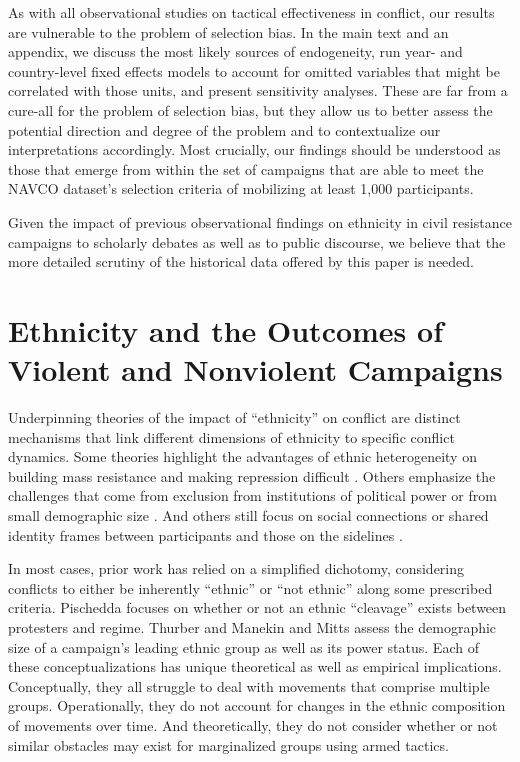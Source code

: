 \documentclass[
  letterpaper,
  DIV=11,
  numbers=noendperiod]{scrartcl}
\begin{document}
As with all observational studies on tactical effectiveness in conflict,
our results are vulnerable to the problem of selection bias. In the main
text and an appendix, we discuss the most likely sources of endogeneity,
run year- and country-level fixed effects models to account for omitted
variables that might be correlated with those units, and present
sensitivity analyses. These are far from a cure-all for the problem of
selection bias, but they allow us to better assess the potential
direction and degree of the problem and to contextualize our
interpretations accordingly. Most crucially, our findings should be
understood as those that emerge from within the set of campaigns that
are able to meet the NAVCO dataset's selection criteria of mobilizing at
least 1,000 participants.

Given the impact of previous observational findings on ethnicity in
civil resistance campaigns to scholarly debates as well as to public
discourse, we believe that the more detailed scrutiny of the historical
data offered by this paper is needed.

\section{Ethnicity and the Outcomes of Violent and Nonviolent
Campaigns}\label{ethnicity-and-the-outcomes-of-violent-and-nonviolent-campaigns}

Underpinning theories of the impact of ``ethnicity'' on conflict are
distinct mechanisms that link different dimensions of ethnicity to
specific conflict dynamics. Some theories highlight the advantages of
ethnic heterogeneity on building mass resistance and making repression
difficult \autocite{Chenoweth2011}. Others emphasize the challenges that
come from exclusion from institutions of political power or from small
demographic size \autocite{Thurber2018,Pischedda2020}. And others still
focus on social connections or shared identity frames between
participants and those on the sidelines
\autocite{Svensson2011,Manekin2022} .

In most cases, prior work has relied on a simplified dichotomy,
considering conflicts to either be inherently ``ethnic'' or ``not
ethnic'' along some prescribed criteria. Pischedda
\autocite*{Pischedda2020} focuses on whether or not an ethnic
``cleavage'' exists between protesters and regime. Thurber
\autocite*{Thurber2018} and Manekin and Mitts \autocite*{Manekin2022}
assess the demographic size of a campaign's leading ethnic group as well
as its power status. Each of these conceptualizations has unique
theoretical as well as empirical implications. Conceptually, they all
struggle to deal with movements that comprise multiple groups.
Operationally, they do not account for changes in the ethnic composition
of movements over time. And theoretically, they do not consider whether
or not similar obstacles may exist for marginalized groups using armed
tactics.
\end{document}
